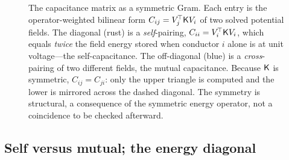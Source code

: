\begin{figure}[t]
\centering
{}
\caption[The capacitance Gram]{The capacitance matrix as a symmetric Gram. Each
entry is the operator-weighted bilinear form $C_{ij}=V_j^{\!\top}\mathsf{K} V_i$ of two
solved potential fields. The diagonal (rust) is a \emph{self}-pairing,
$C_{ii}=V_i^{\!\top}\mathsf{K} V_i$, which equals \emph{twice} the field energy stored
when conductor $i$ alone is at unit voltage---the self-capacitance. The
off-diagonal (blue) is a \emph{cross}-pairing of two different fields, the mutual
capacitance. Because $\mathsf{K}$ is symmetric, $C_{ij}=C_{ji}$: only the upper triangle
is computed and the lower is mirrored across the dashed diagonal. The symmetry is
structural, a consequence of the symmetric energy operator, not a coincidence to be
checked afterward.}
\label{fig:es-gram}
\end{figure}

\subsection{Self versus mutual; the energy diagonal}

